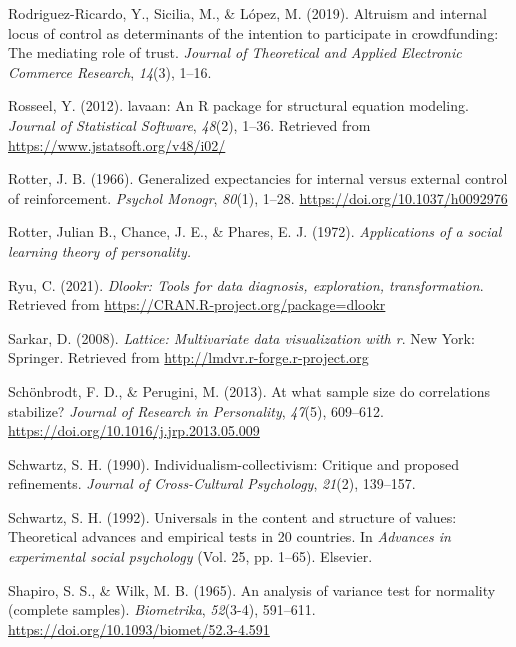 \documentclass[
  man]{apa6}
\newlength{\cslhangindent}
\newlength{\cslentryspacingunit} %
\newenvironment{CSLReferences}[2] %
 {%
  \setlength{\parindent}{0pt}
  \ifodd #1
  \let\oldpar\par
  \def\par{\hangindent=\cslhangindent\oldpar}
  \fi
  \setlength{\parskip}{#2\cslentryspacingunit}
 }%
 {}
\begin{document}
\begin{CSLReferences}{1}{0}
\leavevmode{}%
Rodriguez-Ricardo, Y., Sicilia, M., \& López, M. (2019). Altruism and internal locus of control as determinants of the intention to participate in crowdfunding: The mediating role of trust. \emph{Journal of Theoretical and Applied Electronic Commerce Research}, \emph{14}(3), 1--16.

\leavevmode{}%
Rosseel, Y. (2012). {lavaan}: An {R} package for structural equation modeling. \emph{Journal of Statistical Software}, \emph{48}(2), 1--36. Retrieved from \url{https://www.jstatsoft.org/v48/i02/}

\leavevmode{}%
Rotter, J. B. (1966). Generalized expectancies for internal versus external control of reinforcement. \emph{Psychol Monogr}, \emph{80}(1), 1--28. \url{https://doi.org/10.1037/h0092976}

\leavevmode{}%
Rotter, Julian B., Chance, J. E., \& Phares, E. J. (1972). \emph{Applications of a social learning theory of personality.}

\leavevmode{}%
Ryu, C. (2021). \emph{Dlookr: Tools for data diagnosis, exploration, transformation}. Retrieved from \url{https://CRAN.R-project.org/package=dlookr}

\leavevmode{}%
Sarkar, D. (2008). \emph{Lattice: Multivariate data visualization with r}. New York: Springer. Retrieved from \url{http://lmdvr.r-forge.r-project.org}

\leavevmode{}%
Schönbrodt, F. D., \& Perugini, M. (2013). At what sample size do correlations stabilize? \emph{Journal of Research in Personality}, \emph{47}(5), 609--612. \url{https://doi.org/10.1016/j.jrp.2013.05.009}

\leavevmode{}%
Schwartz, S. H. (1990). Individualism-collectivism: Critique and proposed refinements. \emph{Journal of Cross-Cultural Psychology}, \emph{21}(2), 139--157.

\leavevmode{}%
Schwartz, S. H. (1992). Universals in the content and structure of values: Theoretical advances and empirical tests in 20 countries. In \emph{Advances in experimental social psychology} (Vol. 25, pp. 1--65). Elsevier.

\leavevmode{}%
Shapiro, S. S., \& Wilk, M. B. (1965). An analysis of variance test for normality (complete samples). \emph{Biometrika}, \emph{52}(3-4), 591--611. \url{https://doi.org/10.1093/biomet/52.3-4.591}


\end{CSLReferences}
\end{document}
